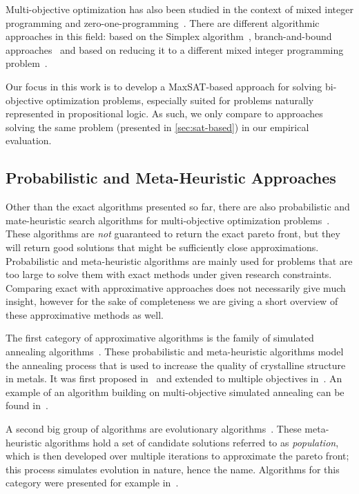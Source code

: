 Multi-objective optimization has also been studied in the context of mixed integer programming and zero-one-programming~\autocite{Ehrgott2005-6,Rasmussen1986,DBLP:journals/eor/AlvesC07}.
There are different algorithmic approaches in this field:
based on the Simplex algorithm~\autocite{Ehrgott2005-7,DBLP:journals/mp/EvansS73}, branch-and-bound approaches~\autocite{Adelgren2021,DBLP:journals/siamjo/SantisENR20} and based on reducing it to a different mixed integer programming problem~\autocite{DBLP:journals/jota/Sun17,DBLP:journals/ol/LuMS20,Soland1979}.

Our focus in this work is to develop a MaxSAT-based approach for solving bi-objective optimization problems, especially suited for problems naturally represented in propositional logic.
As such, we only compare to approaches solving the same problem (presented in \cref{sec:sat-based}) in our empirical evaluation.

\subsection{Probabilistic and Meta-Heuristic Approaches\label{sec:approximative}}

Other than the exact algorithms presented so far, there are also probabilistic and mate-heuristic search algorithms for multi-objective optimization problems~\autocite{Saini2021}.
These algorithms are \emph{not} guaranteed to return the exact pareto front, but they will return good solutions that might be sufficiently close approximations.
Probabilistic and meta-heuristic algorithms are mainly used for problems that are too large to solve them with exact methods under given research constraints.
Comparing exact with approximative approaches does not necessarily give much insight, however for the sake of completeness we are giving a short overview of these approximative methods as well.

The first category of approximative algorithms is the family of simulated annealing algorithms~\autocite{Saini2021}.
These probabilistic and meta-heuristic algorithms model the annealing process that is used to increase the quality of crystalline structure in metals.
It was first proposed in~\textcite{DBLP:journals/science/KirkpatrickGV83} and extended to multiple objectives in~\textcite{DBLP:journals/tec/BandyopadhyaySMD08}.
An example of an algorithm building on multi-objective simulated annealing can be found in~\textcite{DBLP:journals/isci/SenguptaS18}.

A second big group of algorithms are evolutionary algorithms~\autocite{Saini2021,Dasgupta2013}.
These meta-heuristic algorithms hold a set of candidate solutions referred to as \emph{population}, which is then developed over multiple iterations to approximate the pareto front;
this process simulates evolution in nature, hence the name.
Algorithms for this category were presented for example in~\textcite{DBLP:journals/jgo/StornP97,DBLP:journals/tec/DebAPM02}.